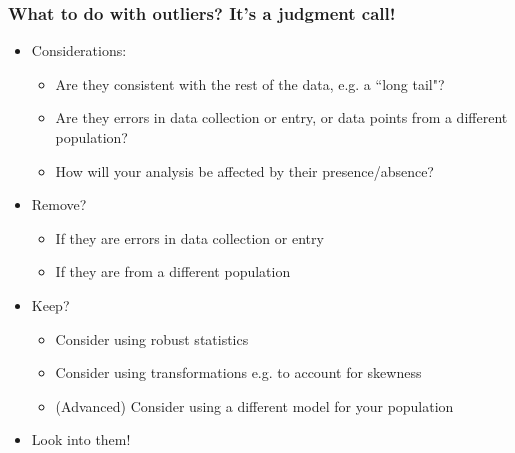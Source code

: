 \documentclass[slidestop,compress,mathserif]{beamer}
\begin{document}


\begin{frame}
\frametitle{What to do with outliers? It's a judgment call!}
\begin{itemize}
  \item Considerations:
  \begin{itemize}
    \item Are they consistent with the rest of the data, e.g. a ``long tail"?
    \item Are they errors in data collection or entry, or data points from a different population?
    \item How will your analysis be affected by their presence/absence?
  \end{itemize}
  \item Remove?
  \begin{itemize}
    \item If they are errors in data collection or entry
    \item If they are from a different population
  \end{itemize}
  \item Keep?
  \begin{itemize}
    \item Consider using robust statistics
    \item Consider using transformations e.g. to account for skewness
    \item (Advanced) Consider using a different model for your population
  \end{itemize}
  \item Look into them!
\end{itemize}
\end{frame}
\end{document}
